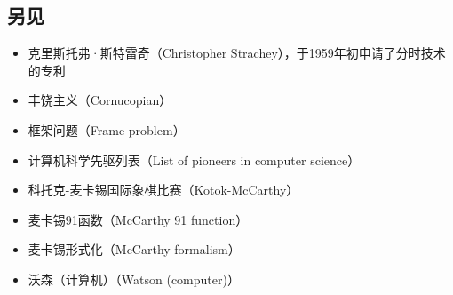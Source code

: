\subsection{另见}
\begin{itemize}
\item 克里斯托弗·斯特雷奇（Christopher Strachey），于1959年初申请了分时技术的专利  
\item 丰饶主义（Cornucopian）  
\item 框架问题（Frame problem）  
\item 计算机科学先驱列表（List of pioneers in computer science）  
\item 科托克-麦卡锡国际象棋比赛（Kotok-McCarthy）  
\item 麦卡锡91函数（McCarthy 91 function）  
\item 麦卡锡形式化（McCarthy formalism）  
\item 沃森（计算机）（Watson (computer)）  
\end{itemize}